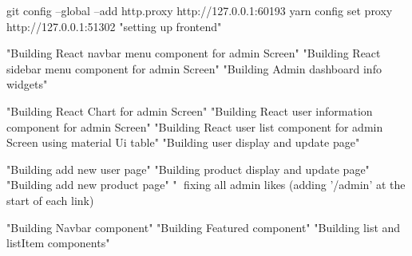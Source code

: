 git config --global --add http.proxy http://127.0.0.1:60193
yarn config set proxy http://127.0.0.1:51302
"setting up frontend"

"Building React navbar menu component for admin Screen"
"Building React sidebar menu component for admin Screen"
"Building Admin dashboard info widgets"

"Building React Chart for admin Screen"
"Building React user information component for admin Screen"
"Building React user list component for admin Screen using material Ui table"
"Building user display and update page"

"Building add new user page"
"Building product display and update page"
"Building add new product page"
"🔨 fixing all admin likes (adding '/admin' at the start of each link)

"Building Navbar component"
"Building Featured component"
"Building list and listItem components"